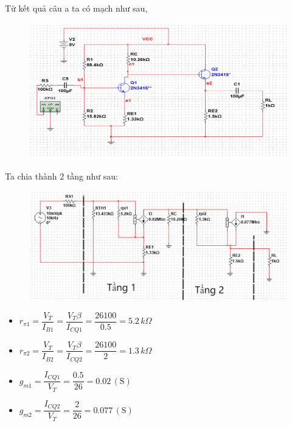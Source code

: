 
Từ kết quả câu a ta có mạch như sau,

\begin{figure}[H]
	\centering
	\includegraphics[width=.8\linewidth]{./my-chapters/my-images/Question9/b_debai.png}
\end{figure}

Ta chia thành 2 tầng như sau:
\begin{figure}[H]
	\centering
	\includegraphics[width=.8\linewidth]{./my-chapters/my-images/Question9/b_sotang.png}
\end{figure}

\begin{itemize}[label=+, leftmargin=2cm]
	\item \( r_{\pi1} = \dfrac{V_T}{I_{B1}} = \dfrac{V_T  \beta}{I_{CQ1}} = \dfrac{26  100}{0.5} = 5.2\,k\Omega \)
	\item \( r_{\pi2} = \dfrac{V_T}{I_{B2}} = \dfrac{V_T  \beta}{I_{CQ2}} = \dfrac{26  100}{2} = 1.3\,k\Omega \)
	\item \( g_{m1} = \dfrac{I_{CQ1}}{V_T} = \dfrac{0.5}{26} = 0.02\,(\text{S}) \)
	\item \( g_{m2} = \dfrac{I_{CQ2}}{V_T} = \dfrac{2}{26} = 0.077\,(\text{S}) \)
\end{itemize}

